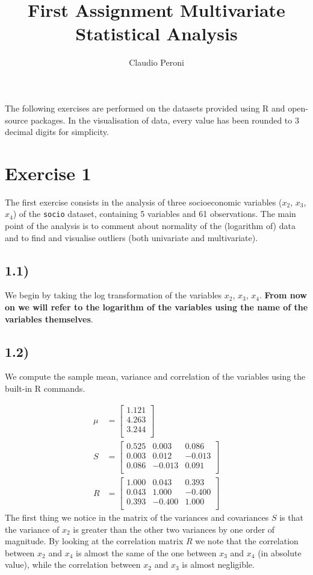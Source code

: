 \documentclass[a4paper,11pt,oneside]{report}
\title{First Assignment Multivariate Statistical Analysis}
\author{Claudio Peroni}
\date{}
\begin{document}
\maketitle
The following exercises are performed on the datasets provided using R and open-source packages. In the visualisation of data, every value has been rounded to 3 decimal digits for simplicity.
\section*{Exercise 1}
The first exercise consists in the analysis of three socioeconomic variables ($x_2$, $x_3$, $x_4$) of the  \texttt{socio} dataset, containing 5 variables and 61 observations. The main point of the analysis is to comment about normality of the (logarithm of) data and to find and visualise outliers (both univariate and multivariate).
\subsection*{1.1)}
	We begin by taking the log transformation of the variables $x_2$, $x_3$, $x_4$.
	\textbf{From now on we will refer to the logarithm of the variables using the name of the variables themselves}.

\subsection*{1.2)}
	We compute the sample mean, variance and correlation of the variables using the built-in R commands.

	\begin{align}
	\mu &= 
	\begin{bmatrix}
	  1.121 \\ 
	  4.263 \\ 
	  3.244 \\ 
	   \end{bmatrix} \nonumber \\
	S &=
	\begin{bmatrix}
	  0.525 & 0.003 & 0.086 \\ 
	  0.003 & 0.012 & -0.013 \\ 
	  0.086 & -0.013 & 0.091 \\ 
	   \end{bmatrix} \nonumber \\
	R &= \begin{bmatrix}
	  1.000 & 0.043 & 0.393 \\ 
	  0.043 & 1.000 & -0.400 \\ 
	  0.393 & -0.400 & 1.000 \\ 
	   \end{bmatrix} \nonumber
	\end{align}
	The first thing we notice in the matrix of the variances and covariances $S$ is that the variance of $x_2$ is greater than the other two variances by one order of magnitude.
	By looking at the correlation matrix $R$ we note that the correlation between $x_2$ and $x_4$ is almost the same of the one between $x_3$ and $x_4$ (in absolute value), while the correlation between $x_2$ and $x_3$ is almost negligible.
\end{document}
